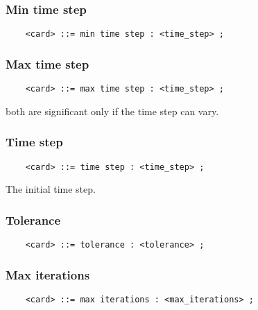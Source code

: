 \subsubsection{Min time step}
\begin{verbatim}
    <card> ::= min time step : <time_step> ;
\end{verbatim}

\subsubsection{Max time step}
\begin{verbatim}
    <card> ::= max time step : <time_step> ;
\end{verbatim}
both are significant only if the time step can vary.

\subsubsection{Time step}
\begin{verbatim}
    <card> ::= time step : <time_step> ;
\end{verbatim}
The initial time step.

\subsubsection{Tolerance}
\begin{verbatim}
    <card> ::= tolerance : <tolerance> ;
\end{verbatim}

\subsubsection{Max iterations}
\begin{verbatim}
    <card> ::= max iterations : <max_iterations> ;
\end{verbatim}

